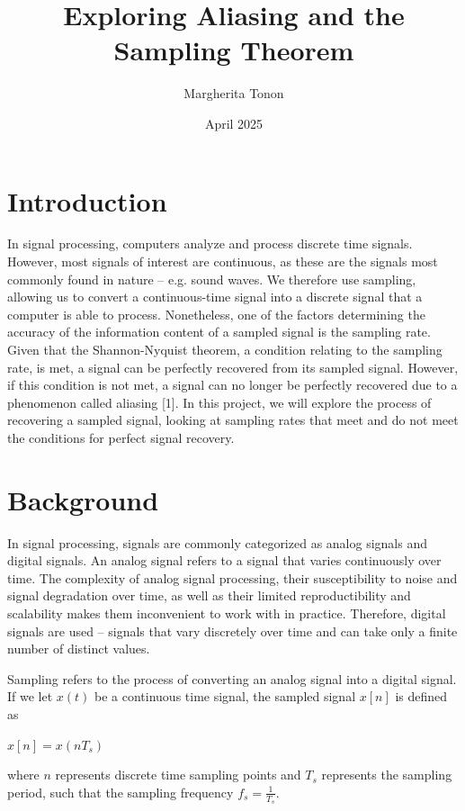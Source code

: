 \documentclass{article}
\title{Exploring Aliasing and the Sampling Theorem} %
\author{Margherita Tonon}
\date{April 2025}
\begin{document}
\maketitle

\section{Introduction}
In signal processing, computers analyze and process discrete time signals. 
However, most signals of interest are continuous, as these are the signals most commonly found in nature -- e.g. sound waves.
We therefore use sampling, allowing us to convert a continuous-time signal into a discrete signal that a computer is able to process.
Nonetheless, one of the factors determining the accuracy of the information content of a sampled signal is the sampling rate. %
Given that the Shannon-Nyquist theorem, a condition relating to the sampling rate, is met, a signal can be perfectly recovered from its sampled signal. 
However, if this condition is not met, a signal can no longer be perfectly recovered due to a phenomenon called aliasing [1].
In this project, we will explore the process of recovering a sampled signal, looking at sampling rates that meet and do not meet the conditions for perfect signal recovery.


\section{Background}
In signal processing, signals are commonly categorized as analog signals and digital signals.
An analog signal refers to a signal that varies continuously over time. 
The complexity of analog signal processing, their susceptibility to noise and signal degradation over time, as well as their limited reproductibility and scalability makes them inconvenient to work with in practice. 
Therefore, digital signals are used -- signals that vary discretely over time and can take only a finite number of distinct values.

Sampling refers to the process of converting an analog signal into a digital signal. If we let $x(t)$ be a continuous time signal, the sampled signal $x[n]$ is defined as
\begin{center}
    \begin{math}
        x[n] = x(nT_s)
    \end{math}  
\end{center}
where $n$ represents discrete time sampling points and $T_s$ represents the sampling period, such that the sampling frequency $f_s = \frac{1}{T_s}$.
\end{document}
